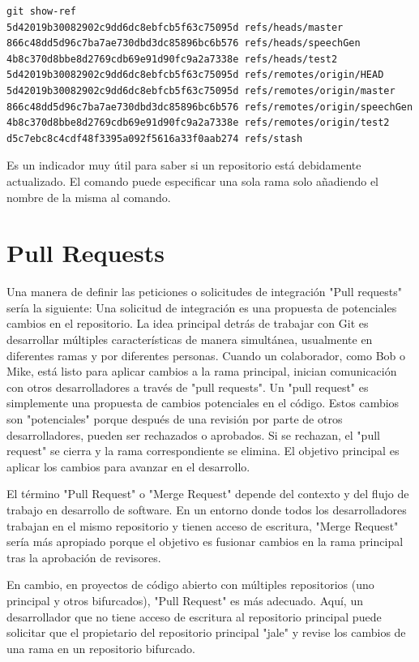 \begin{verbatim}
git show-ref     
5d42019b30082902c9dd6dc8ebfcb5f63c75095d refs/heads/master
866c48dd5d96c7ba7ae730dbd3dc85896bc6b576 refs/heads/speechGen
4b8c370d8bbe8d2769cdb69e91d90fc9a2a7338e refs/heads/test2
5d42019b30082902c9dd6dc8ebfcb5f63c75095d refs/remotes/origin/HEAD
5d42019b30082902c9dd6dc8ebfcb5f63c75095d refs/remotes/origin/master
866c48dd5d96c7ba7ae730dbd3dc85896bc6b576 refs/remotes/origin/speechGen
4b8c370d8bbe8d2769cdb69e91d90fc9a2a7338e refs/remotes/origin/test2
d5c7ebc8c4cdf48f3395a092f5616a33f0aab274 refs/stash
\end{verbatim}

Es un indicador muy útil para saber si un repositorio está debidamente actualizado. El comando puede especificar una sola rama solo añadiendo el nombre de la misma al comando.

\section{Pull Requests}

Una manera de definir las peticiones o solicitudes de integración "Pull requests" sería la siguiente:
Una solicitud de integración es una propuesta de potenciales cambios en el repositorio. La idea principal detrás de trabajar con Git es desarrollar múltiples características de manera simultánea, usualmente en diferentes ramas y por diferentes personas. Cuando un colaborador, como Bob o Mike, está listo para aplicar cambios a la rama principal, inician comunicación con otros desarrolladores a través de "pull requests". Un "pull request" es simplemente una propuesta de cambios potenciales en el código. Estos cambios son "potenciales" porque después de una revisión por parte de otros desarrolladores, pueden ser rechazados o aprobados. Si se rechazan, el "pull request" se cierra y la rama correspondiente se elimina. El objetivo principal es aplicar los cambios para avanzar en el desarrollo.

El término "Pull Request" o "Merge Request" depende del contexto y del flujo de trabajo en desarrollo de software. En un entorno donde todos los desarrolladores trabajan en el mismo repositorio y tienen acceso de escritura, "Merge Request" sería más apropiado porque el objetivo es fusionar cambios en la rama principal tras la aprobación de revisores.

En cambio, en proyectos de código abierto con múltiples repositorios (uno principal y otros bifurcados), "Pull Request" es más adecuado. Aquí, un desarrollador que no tiene acceso de escritura al repositorio principal puede solicitar que el propietario del repositorio principal "jale" y revise los cambios de una rama en un repositorio bifurcado.

